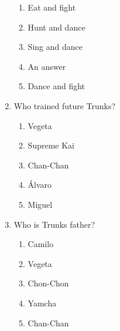 \documentclass[letterpaper,addpoints,answers,twocolumn,10pt]{exam}
\begin{document}
\begin{enumerate}[leftmargin=.2in]
\begin{enumerate}[noitemsep,leftmargin=0in]
\item  Eat and fight
\item  Hunt and dance
\item  Sing and dance
\item  An answer
\item  Dance and fight


\end{enumerate}



\item  Who trained future Trunks?


\begin{enumerate}[noitemsep,leftmargin=0in]


\item  Vegeta
\item  Supreme Kai
\item  Chan-Chan
\item  Álvaro
\item  Miguel


\end{enumerate}



\item  Who is Trunks father?


\begin{enumerate}[noitemsep,leftmargin=0in]


\item  Camilo
\item  Vegeta
\item  Chon-Chon
\item  Yamcha
\item  Chan-Chan


\end{enumerate}



\end{enumerate}
\end{document}
